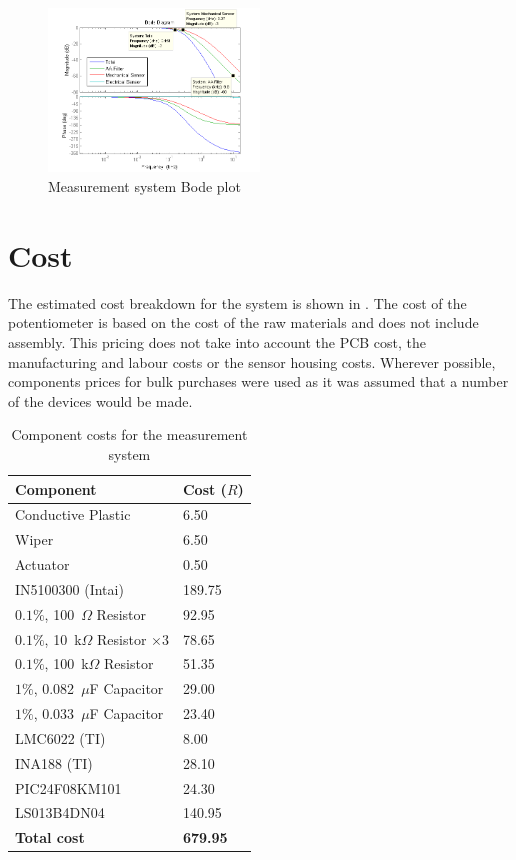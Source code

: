 \documentclass[10pt,twocolumn]{witseiepaper}
\begin{document}
\begin{figure}[h!]
	\centering
	\includegraphics[width=0.5\textwidth]{bode}
	\caption{Measurement system Bode plot}
	\label{fig:bode}
\end{figure}

\section{Cost}

The estimated cost breakdown for the system is shown in . The cost of the potentiometer is based on the cost of the raw materials and does not include assembly. This pricing does not take into account the PCB cost, the manufacturing and labour costs or the sensor housing costs. Wherever possible, components prices for bulk purchases were used as it was assumed that a number of the devices would be made.

\begin{table}[h!]
	\caption{Component costs for the measurement system} \label{tab:cost}
	\begin{tabular}{|p{}| p{}|}
		\hline
		\textbf{Component } & \textbf{Cost ($R$)} \\ \hline
		Conductive Plastic & 6.50 \\
		Wiper &  6.50 \\
		Actuator & 0.50 \\
		IN5100300 (Intai) & 189.75 \\
		$0.1\%$, 100~$\Omega$ Resistor& 92.95 \\
		$0.1\%$, 10~k$\Omega$ Resistor $\times 3$ & 78.65  \\
		$0.1\%$, 100~k$\Omega$ Resistor & 51.35\\
		$1\%$, 0.082~$\mu$F Capacitor &  29.00 \\
		$1\%$, 0.033~$\mu$F Capacitor &  23.40\\
		LMC6022 (TI) & 8.00 \\
		INA188 (TI)&  28.10 \\
		PIC24F08KM101 & 24.30 \\
		LS013B4DN04 & 140.95 \\ \hline
		\textbf{Total cost} &  \textbf{679.95} \\ \hline
	\end{tabular}
\end{table}
\end{document}
